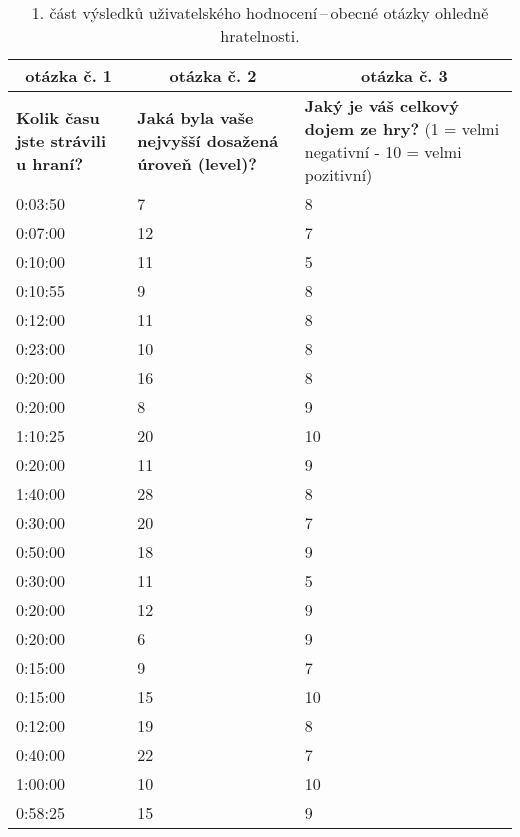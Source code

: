 \begin{table}[htbp]
\centering
\begin{tabularx}{\textwidth}{|X|X|X|}
\hline
\multicolumn{1}{|c|}{\textbf{otázka č. 1}} & \multicolumn{1}{c|}{\textbf{otázka č. 2}} & \multicolumn{1}{c|}{\textbf{otázka č. 3}} \\ \hline
\textbf{Kolik času jste strávili u hraní?} & \textbf{Jaká byla vaše nejvyšší dosažená úroveň (level)?} & \textbf{Jaký je váš celkový dojem ze hry?} (1 = velmi negativní - 10 = velmi pozitivní) \\ \hline
0:03:50 & 7 & 8 \\ \hline
0:07:00 & 12 & 7 \\ \hline
0:10:00 & 11 & 5 \\ \hline
0:10:55 & 9 & 8 \\ \hline
0:12:00 & 11 & 8 \\ \hline
0:23:00 & 10 & 8 \\ \hline
0:20:00 & 16 & 8 \\ \hline
0:20:00 & 8 & 9 \\ \hline
1:10:25 & 20 & 10 \\ \hline
0:20:00 & 11 & 9 \\ \hline
1:40:00 & 28 & 8 \\ \hline
0:30:00 & 20 & 7 \\ \hline
0:50:00 & 18 & 9 \\ \hline
0:30:00 & 11 & 5 \\ \hline
0:20:00 & 12 & 9 \\ \hline
0:20:00 & 6 & 9 \\ \hline
0:15:00 & 9 & 7 \\ \hline
0:15:00 & 15 & 10 \\ \hline
0:12:00 & 19 & 8 \\ \hline
0:40:00 & 22 & 7 \\ \hline
1:00:00 & 10 & 10 \\ \hline
0:58:25 & 15 & 9 \\ \hline
\end{tabularx}
\caption{1. část výsledků uživatelského hodnocení\,--\,obecné otázky ohledně hratelnosti.}
\end{table}

